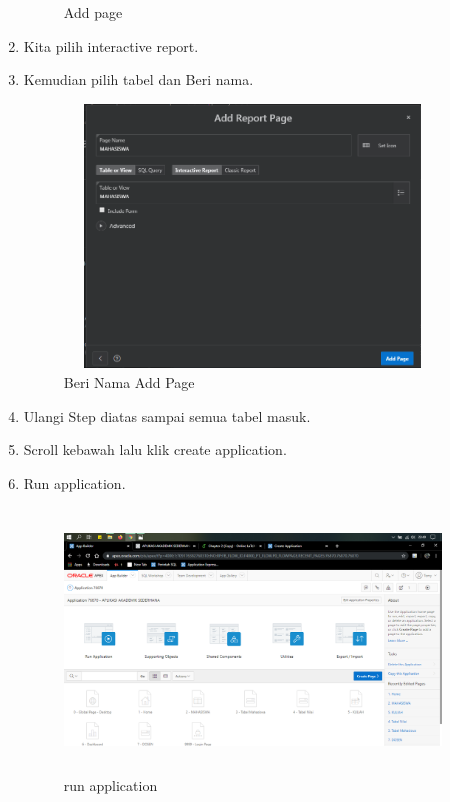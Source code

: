 \begin{enumerate}
\begin{figure}[!htbp]
\caption{Add page}
\label{penanda}
\end{figure}
\item Kita pilih interactive report.
\item Kemudian pilih tabel dan Beri nama.
\begin{figure}[!htbp]
\centering
\includegraphics[width=10cm,height=7cm]{figures/H7.PNG}
\caption{Beri Nama Add Page}
\label{penanda}
\end{figure}
\item Ulangi Step diatas sampai semua tabel masuk.
\item  Scroll kebawah lalu klik create application.
\item Run application.
\begin{figure}[!htbp]
\centering
\includegraphics[width=10cm,height=7cm]{figures/H8.PNG}
\caption{run application}
\label{penanda}
\end{figure}

\end{enumerate}
